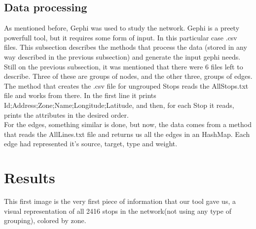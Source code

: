 \documentclass[12pt]{article}
\begin{document}
\subsection{Data processing}
	
	As mentioned before, Gephi was used to study the network. Gephi is a preety powerfull tool, but it requires some form of input. In this particular case .csv files. This subsection describes the methods that process the data (stored in any way described in the previous subsection) and generate the input gephi needs.\\
	Still on the previous subsection, it was mentioned that there were 6 files left to describe. Three of these are groups of nodes, and the other three, groups of edges.\\
	
	The method that creates the .csv file for ungrouped Stops reads the  AllStops.txt file and works from there. In the first line it prints Id;Address;Zone;Name;Longitude;Latitude, and then, for each Stop it reads, prints the attributes in the desired order.\\
	For the edges, something similar is done, but now, the data comes from a method that reads the AllLines.txt file and returns us all the edges in an HashMap. Each edge had represented it's source, target, type and weight.
	
	
	
	
\section{Results}
	This first image is the very first piece of information that our tool gave us, a visual representation of all 2416 stops in the network(not using any type of grouping), colored by zone.\\
\end{document}
